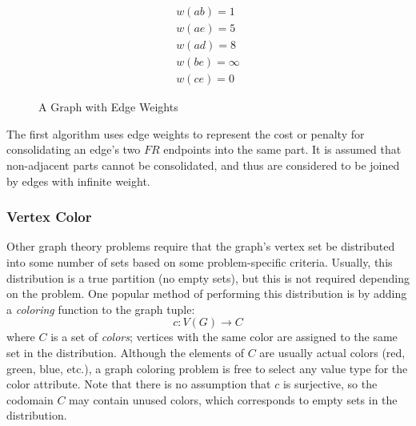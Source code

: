 \begin{figure}[h]
  \label{fig:exweight}
  \begin{minipage}[t]{3in}
    \begin{center}
      \vspace{0in}
    \end{center}
  \end{minipage}
  \begin{minipage}[t]{3in}
    \begin{gather*}
      w(ab)=1 \\
      w(ae)=5 \\
      w(ad)=8 \\
      w(be)=\infty \\
      w(ce)=0
    \end{gather*}
  \end{minipage}
  \caption{A Graph with Edge Weights}
\end{figure}

The first algorithm uses edge weights to represent the cost or penalty for consolidating an edge's two \(FR\)
endpoints into the same part.  It is assumed that non-adjacent parts cannot be consolidated, and thus are
considered to be joined by edges with infinite weight.

\subsubsection{Vertex Color}

Other graph theory problems require that the graph's vertex set be distributed into some number of sets based on
some problem-specific criteria.  Usually, this distribution is a true partition (no empty sets), but this is not
required depending on the problem.  One popular method of performing this distribution is by adding a
\emph{coloring} function to the graph tuple:
\[c:V(G)\to C\]
where \(C\) is a set of \emph{colors}; vertices with the same color are assigned to the same set in the
distribution.  Although the elements of \(C\) are usually actual colors (red, green, blue, etc.), a graph coloring
problem is free to select any value type for the color attribute.  Note that there is no assumption that \(c\) is
surjective, so the codomain \(C\) may contain unused colors, which corresponds to empty sets in the distribution.

